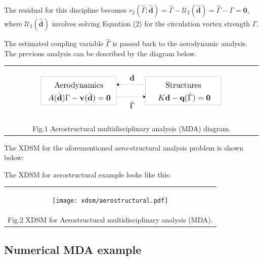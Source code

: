 \documentclass[11pt]{article}
\begin{document}
The residual for this discipline becomes
\(r_2(\hat{\Gamma};\hat{\mathbf{d}}) = \hat{\Gamma} - \mathcal{U}_2(\hat{\mathbf{d}}) = \hat{\Gamma} - {\Gamma} = \mathbf{0}\),
where \(\mathcal{U}_2(\hat{\mathbf{d}})\) involves solving Equation (2)
for the circulation vortex strength \(\Gamma\).

The estimated coupling variable \(\hat{\Gamma}\) is passed back to the
aerodynamic analysis. The previous analysis can be described by the
diagram below.

\begin{longtable}[]{@{}c@{}}
\toprule
\endhead
\begin{minipage}[t]{0.97\columnwidth}\centering
    \begin{figure}
        \centering
        \includegraphics[width=0.9\textwidth]{images/MDA_diagram_aero.png}
    \end{figure}\strut
\end{minipage}\tabularnewline
Fig.1 Aerostructural multidisciplinary analysis (MDA)
diagram.\tabularnewline
\bottomrule
\end{longtable}

The XDSM for the aforementioned aero-structural analysis problem is
shown below:

The XDSM for aerostructural example looks like this:

\begin{longtable}[]{@{}c@{}}
\toprule
\endhead
\begin{minipage}[t]{0.97\columnwidth}\centering
    \begin{figure}
        \centering
        \texttt{[image: xdsm/aerostructural.pdf]}
    \end{figure}\strut
\end{minipage}\tabularnewline
Fig.2 XDSM for Aerostructural multidisciplinary analysis
(MDA).\tabularnewline
\bottomrule
\end{longtable}

    \hypertarget{numerical-mda-example}{%
\subsection{Numerical MDA example}\label{numerical-mda-example}}
\end{document}
